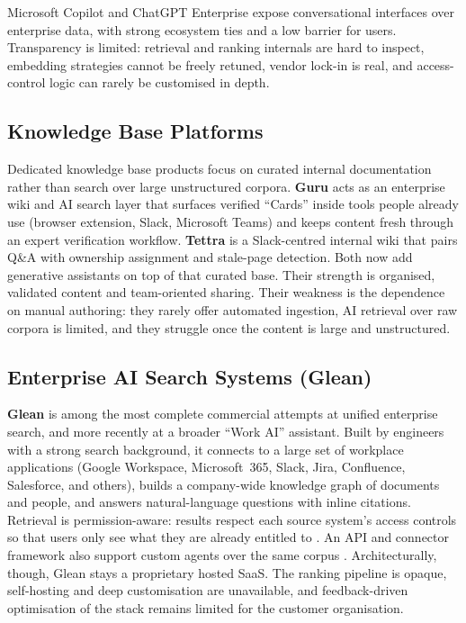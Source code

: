 Microsoft Copilot and ChatGPT Enterprise \cite{microsoft-copilot} expose
conversational interfaces over enterprise data, with strong ecosystem ties and a
low barrier for users. Transparency is limited: retrieval and ranking internals
are hard to inspect, embedding strategies cannot be freely retuned, vendor lock-in
is real, and access-control logic can rarely be customised in depth.

\subsection{Knowledge Base Platforms}

Dedicated knowledge base products focus on curated internal documentation rather
than search over large unstructured corpora. \textbf{Guru} \cite{guru-docs} acts
as an enterprise wiki and AI search layer that surfaces verified ``Cards'' inside
tools people already use (browser extension, Slack, Microsoft Teams) and keeps
content fresh through an expert verification workflow. \textbf{Tettra}
\cite{tettra-docs} is a Slack-centred internal wiki that pairs Q\&A with
ownership assignment and stale-page detection. Both now add generative assistants
on top of that curated base. Their strength is organised, validated content and
team-oriented sharing. Their weakness is the dependence on manual authoring: they
rarely offer automated ingestion, AI retrieval over raw corpora is limited, and
they struggle once the content is large and unstructured.

\subsection{Enterprise AI Search Systems (Glean)}

\textbf{Glean} \cite{glean-platform} is among the most complete commercial
attempts at unified enterprise search, and more recently at a broader ``Work AI''
assistant. Built by engineers with a strong search background, it connects to a
large set of workplace applications (Google Workspace, Microsoft~365, Slack,
Jira, Confluence, Salesforce, and others), builds a company-wide knowledge graph
of documents and people, and answers natural-language questions with inline
citations. Retrieval is permission-aware: results respect each source system's
access controls so that users only see what they are already entitled to
\cite{glean-docs}. An API and connector framework also support custom agents over
the same corpus \cite{glean-docs}. Architecturally, though, Glean stays a
proprietary hosted SaaS. The ranking pipeline is opaque, self-hosting and deep
customisation are unavailable, and feedback-driven optimisation of the stack
remains limited for the customer organisation.

